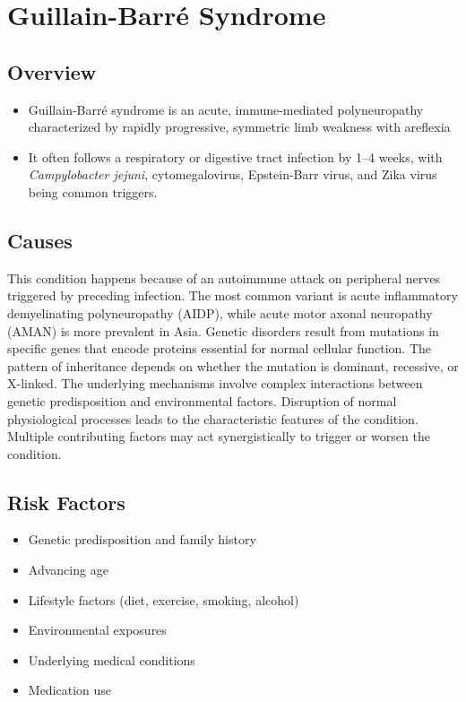 \chapter{Guillain-Barr\'{e} Syndrome}
\label{sec:Guillain-Barré Syndrome}

\section{Overview}


\begin{itemize}[noitemsep]
  \item Guillain-Barr\'{e} syndrome is an acute, immune-mediated polyneuropathy characterized by rapidly progressive, symmetric limb weakness with areflexia
  \item It often follows a respiratory or digestive tract infection by 1--4 weeks, with \textit{Campylobacter jejuni}, cytomegalovirus, Epstein-Barr virus, and Zika virus being common triggers.
\end{itemize}
\section{Causes}
This condition happens because of an autoimmune attack on peripheral nerves triggered by preceding infection. The most common variant is acute inflammatory demyelinating polyneuropathy (AIDP), while acute motor axonal neuropathy (AMAN) is more prevalent in Asia. Genetic disorders result from mutations in specific genes that encode proteins essential for normal cellular function. The pattern of inheritance depends on whether the mutation is dominant, recessive, or X-linked. The underlying mechanisms involve complex interactions between genetic predisposition and environmental factors. Disruption of normal physiological processes leads to the characteristic features of the condition. Multiple contributing factors may act synergistically to trigger or worsen the condition.
\section{Risk Factors}


\begin{itemize}[noitemsep]
  \item Genetic predisposition and family history
  \item Advancing age
  \item Lifestyle factors (diet, exercise, smoking, alcohol)
  \item Environmental exposures
  \item Underlying medical conditions
  \item Medication use
\end{itemize}
